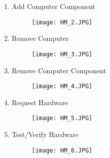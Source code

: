 \documentclass{article}
\begin{document}
\begin{enumerate}
\begin{enumerate}
                    \item{Add Computer Component}
                    \begin{figure}[H]
                    	\centering
                        \texttt{[image: HM\_2.JPG]}
                        \newline
                        \newline
                    \end{figure}
                    
                    
                    \item{Remove Computer}
                    \begin{figure}[H]
                    	\centering
                        \texttt{[image: HM\_3.JPG]}
                        \newline
                        \newline
                    \end{figure}
                    
                     \item{Remove Computer Component}
                    \begin{figure}[H]
                    	\centering
                        \texttt{[image: HM\_4.JPG]}
                        \newline
                        \newline
                    \end{figure}
                    
                     \item{Request Hardware}
                    \begin{figure}[H]
                    	\centering
                        \texttt{[image: HM\_5.JPG]}
                        \newline
                        \newline
                    \end{figure}
                    
                    \item{Test/Verify Hardware}
                    \begin{figure}[H]
                    	\centering
                        \texttt{[image: HM\_6.JPG]}
                        \newline
                        \newline
                    \end{figure}
                 \end{enumerate}
                 

\end{enumerate}
\end{document}
